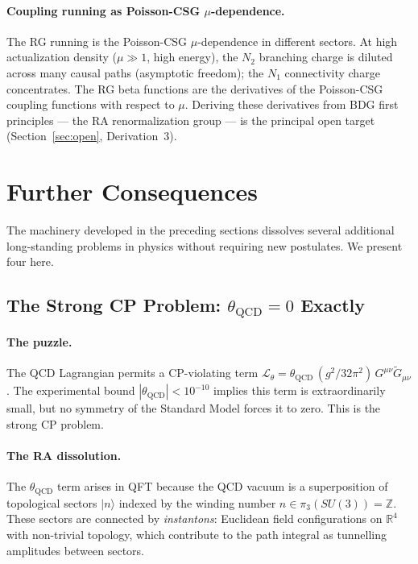 \documentclass[11pt,a4paper]{article}
\begin{document}
\paragraph{Coupling running as Poisson-CSG $\mu$-dependence.}
The RG running is the Poisson-CSG $\mu$-dependence in different sectors.
At high actualization density ($\mu \gg 1$, high energy), the $N_2$ branching
charge is diluted across many causal paths (asymptotic freedom); the $N_1$
connectivity charge concentrates. The RG beta functions are the derivatives
of the Poisson-CSG coupling functions with respect to $\mu$.  Deriving these
derivatives from BDG first principles — the RA renormalization group — is
the principal open target (Section~\ref{sec:open}, Derivation~3).


\section{Further Consequences}
\label{sec:consequences}

The machinery developed in the preceding sections dissolves several
additional long-standing problems in physics without requiring new
postulates. We present four here.

\subsection{The Strong CP Problem: $\theta_{\mathrm{QCD}} = 0$ Exactly}
\label{sec:strong_cp}

\paragraph{The puzzle.}
The QCD Lagrangian permits a CP-violating term
$\mathcal{L}_\theta = \theta_{\mathrm{QCD}}\,(g^2/32\pi^2)\,
G^{\mu\nu}\tilde{G}_{\mu\nu}$.
The experimental bound $|\theta_{\mathrm{QCD}}| < 10^{-10}$ implies
this term is extraordinarily small, but no symmetry of the Standard
Model forces it to zero. This is the strong CP problem.

\paragraph{The RA dissolution.}
The $\theta_{\mathrm{QCD}}$ term arises in QFT because the QCD vacuum
is a superposition of topological sectors $|n\rangle$ indexed by the
winding number $n \in \pi_3(SU(3)) = \mathbb{Z}$. These sectors are
connected by \emph{instantons}: Euclidean field configurations on
$\mathbb{R}^4$ with non-trivial topology, which contribute to the
path integral as tunnelling amplitudes between sectors.
\end{document}
